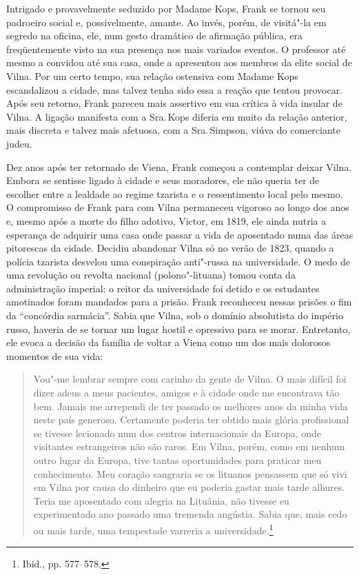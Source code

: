 %

Intrigado e provavelmente seduzido por Madame Kops, Frank se tornou seu
padroeiro social e, possivelmente, amante. Ao invés, porém, de visitá"-la
em segredo na oficina, ele, num gesto dramático de afirmação pública,
era freqüentemente visto na sua presença nos mais variados eventos. O
professor até mesmo a convidou até sua casa, onde a apresentou aos
membros da elite social de Vilna. Por um certo tempo, sua relação
ostensiva com Madame Kops escandalizou a cidade, mas talvez tenha sido
essa a reação que tentou provocar. Após seu retorno, Frank pareceu mais
assertivo em sua crítica à vida insular de Vilna. A ligação manifesta
com a Sra.\,Kops diferia em muito da relação anterior, mais discreta e
talvez mais afetuosa, com a Sra.\,Simpson, viúva do comerciante judeu.

Dez anos após ter retornado de Viena, Frank começou a contemplar deixar
Vilna. Embora se sentisse ligado à cidade e seus moradores, ele não
queria ter de escolher entre a lealdade ao regime tzarista e o
ressentimento local pelo mesmo. O compromisso de Frank para com Vilna
permaneceu vigoroso ao longo dos anos e, mesmo após a morte do filho
adotivo, Victor, em 1819, ele ainda nutria a esperança de adquirir uma
casa onde passar a vida de aposentado numa das áreas pitorescas da
cidade. Decidiu abandonar Vilna só no verão de 1823, quando a polícia
tzarista desvelou uma conspiração anti"-russa na universidade. O medo de
uma revolução ou revolta nacional (polono"-lituana) tomou conta da
administração imperial: o reitor da universidade foi detido e os
estudantes amotinados foram mandados para a prisão. Frank reconheceu
nessas prisões o fim da ``concórdia sarmácia''. Sabia que Vilna, sob o
domínio absolutista do império russo, haveria de se tornar um lugar
hostil e opressivo para se morar. Entretanto, ele evoca a decisão da
família de voltar a Viena como um dos mais dolorosos momentos de sua
vida:

\begin{quote}
Vou"-me lembrar sempre com carinho da gente de Vilna. O mais difícil foi
dizer adeus a meus pacientes, amigos e à cidade onde me encontrava tão
bem. Jamais me arrependi de ter passado os melhores anos da minha vida
neste país generoso. Certamente poderia ter obtido mais glória
profissional se tivesse lecionado num dos centros internacionais da
Europa, onde visitantes estrangeiros não são raros. Em Vilna, porém,
como em nenhum outro lugar da Europa, tive tantas oportunidades para
praticar meu conhecimento. Meu coração sangraria se os lituanos
pensassem que só vivi em Vilna por causa do dinheiro que eu poderia
gastar mais tarde alhures. Teria me aposentado com alegria na Lituânia, 
não tivesse eu experimentado ano passado uma tremenda angústia. Sabia
que, mais cedo ou mais tarde, uma tempestade varreria a
universidade.\footnote{Ibid., pp. 577--578.}
\end{quote}

